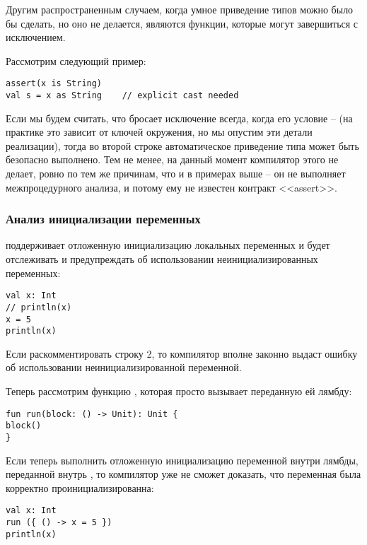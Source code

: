 Другим распространенным случаем, когда умное приведение типов можно было бы сделать, но оно не делается, являются функции, которые могут завершиться с исключением. 

Рассмотрим следующий пример:

\begin{verbatim}
assert(x is String)
val s = x as String    // explicit cast needed
\end{verbatim}

Если мы будем считать, что  бросает исключение всегда, когда его условие --  (на практике это зависит от ключей окружения, но мы опустим эти детали реализации), тогда во второй строке автоматическое приведение типа может быть безопасно выполнено. Тем не менее, на данный момент компилятор  этого не делает, ровно по тем же причинам, что и в примерах выше -- он не выполняет межпроцедурного анализа, и потому ему не известен контракт <<assert>>. 




\subsubsection{Анализ инициализации переменных}

 поддерживает отложенную инициализацию локальных переменных и будет отслеживать и предупреждать об использовании неинициализированных переменных:

\begin{verbatim}
val x: Int
// println(x)
x = 5
println(x)
\end{verbatim}

Если раскомментировать строку 2, то компилятор вполне законно выдаст ошибку об использовании неинициализированной переменной. 

Теперь рассмотрим функцию , которая просто вызывает переданную ей лямбду: 
\begin{verbatim}
fun run(block: () -> Unit): Unit {
block()
}
\end{verbatim}

Если теперь выполнить отложенную инициализацию переменной внутри лямбды, переданной внутрь , то компилятор уже не сможет доказать, что переменная была корректно проинициализированна:

\begin{verbatim}
val x: Int
run ({ () -> x = 5 })
println(x)
\end{verbatim}

